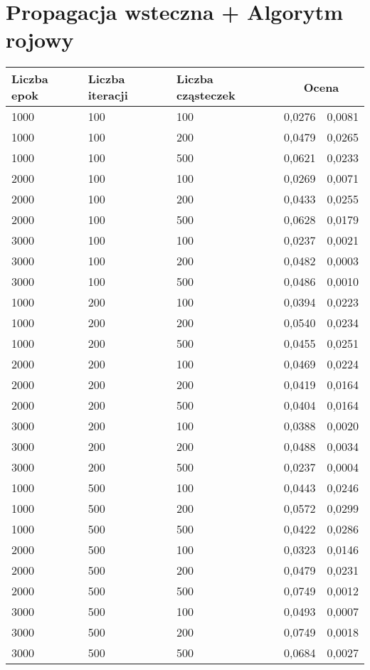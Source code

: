 \documentclass[11pt,a4paper,oneside]{report}
\begin{document}
\section{Propagacja wsteczna + Algorytm rojowy}
\begin{center}
	\begin{longtable}{|l|l|l|r@{$\pm$}r|}
		\hline
		Liczba epok & Liczba iteracji & Liczba cząsteczek & \multicolumn{2}{|c|}{Ocena}\\ \hline \hline\endhead
		1000 & 100 & 100 & 0,0276 & 0,0081\\ \hline
		1000 & 100 & 200 & 0,0479 & 0,0265\\ \hline
		1000 & 100 & 500 & 0,0621 & 0,0233\\ \hline
		2000 & 100 & 100 & 0,0269 & 0,0071\\ \hline
		2000 & 100 & 200 & 0,0433 & 0,0255\\ \hline
		2000 & 100 & 500 & 0,0628 & 0,0179\\ \hline
		3000 & 100 & 100 & 0,0237 & 0,0021\\ \hline
		3000 & 100 & 200 & 0,0482 & 0,0003\\ \hline
		3000 & 100 & 500 & 0,0486 & 0,0010\\ \hline
		1000 & 200 & 100 & 0,0394 & 0,0223\\ \hline
		1000 & 200 & 200 & 0,0540 & 0,0234\\ \hline
		1000 & 200 & 500 & 0,0455 & 0,0251\\ \hline
		2000 & 200 & 100 & 0,0469 & 0,0224\\ \hline
		2000 & 200 & 200 & 0,0419 & 0,0164\\ \hline
		2000 & 200 & 500 & 0,0404 & 0,0164\\ \hline
		3000 & 200 & 100 & 0,0388 & 0,0020\\ \hline
		3000 & 200 & 200 & 0,0488 & 0,0034\\ \hline
		3000 & 200 & 500 & 0,0237 & 0,0004\\ \hline
		1000 & 500 & 100 & 0,0443 & 0,0246\\ \hline
		1000 & 500 & 200 & 0,0572 & 0,0299\\ \hline
		1000 & 500 & 500 & 0,0422 & 0,0286\\ \hline
		2000 & 500 & 100 & 0,0323 & 0,0146\\ \hline
		2000 & 500 & 200 & 0,0479 & 0,0231\\ \hline
		2000 & 500 & 500 & 0,0749 & 0,0012\\ \hline
		3000 & 500 & 100 & 0,0493 & 0,0007\\ \hline
		3000 & 500 & 200 & 0,0749 & 0,0018\\ \hline
		3000 & 500 & 500 & 0,0684 & 0,0027\\ \hline
	\end{longtable}
\end{center}
\end{document}
